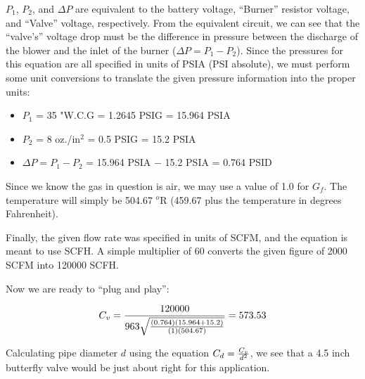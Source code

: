 $P_1$, $P_2$, and $\Delta P$ are equivalent to the battery voltage, ``Burner'' resistor voltage, and ``Valve'' voltage, respectively.  From the equivalent circuit, we can see that the ``valve's'' voltage drop must be the difference in pressure between the discharge of the blower and the inlet of the burner ($\Delta P = P_1 - P_2$).  Since the pressures for this equation are all specified in units of PSIA (PSI absolute), we must perform some unit conversions to translate the given pressure information into the proper units:

\begin{itemize}
\item{} $P_1$ = 35 "W.C.G = 1.2645 PSIG = 15.964 PSIA
\item{} $P_2$ = 8 oz./in$^{2}$ = 0.5 PSIG = 15.2 PSIA
\vskip 5pt
\item{} $\Delta P = P_1 - P_2$ = 15.964 PSIA $-$ 15.2 PSIA = 0.764 PSID
\end{itemize}

Since we know the gas in question is air, we may use a value of 1.0 for $G_f$.  The temperature will simply be 504.67 $^{o}$R (459.67 plus the temperature in degrees Fahrenheit).

\vskip 10pt

Finally, the given flow rate was specified in units of SCFM, and the equation is meant to use SCFH.  A simple multiplier of 60 converts the given figure of 2000 SCFM into 120000 SCFH.

\vskip 10pt

Now we are ready to ``plug and play'':

$$C_v = {120000 \over 963 \sqrt{{(0.764) (15.964 + 15.2)} \over {(1) (504.67)}}} = 573.53$$

\vskip 10pt

Calculating pipe diameter $d$ using the equation $C_d = {C_v \over d^2}$, we see that a 4.5 inch butterfly valve would be just about right for this application.





